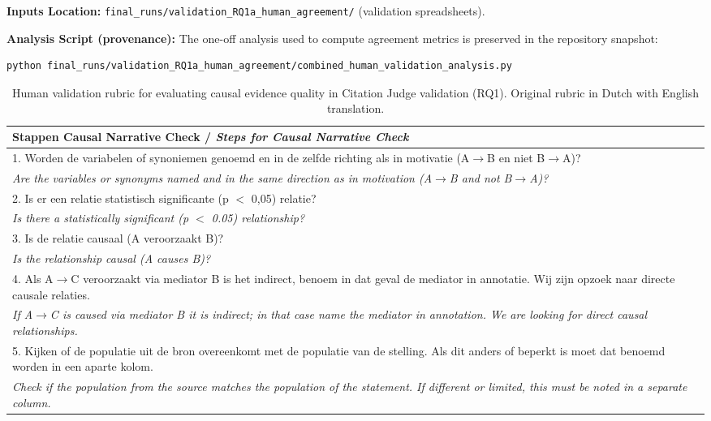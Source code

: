 \textbf{Inputs Location:} \texttt{final\_runs/validation\_RQ1a\_human\_agreement/} (validation spreadsheets).

\textbf{Analysis Script (provenance):} The one-off analysis used to compute agreement metrics is preserved in the repository snapshot:
{\small
\begin{verbatim}
python final_runs/validation_RQ1a_human_agreement/combined_human_validation_analysis.py
\end{verbatim}
}

\begin{table}[H]
\centering
\caption[Human validation rubric for RQ1]{Human validation rubric for evaluating causal evidence quality in Citation Judge validation (RQ1). Original rubric in Dutch with English translation.}
\label{tab:human-validation-rubric-rq1}
\small

\begin{tabular}{p{}}
\toprule
\textbf{Stappen Causal Narrative Check} / \textit{Steps for Causal Narrative Check} \\
\midrule
1. Worden de variabelen of synoniemen genoemd en in de zelfde richting als in motivatie (A$\to$B en niet B$\to$A)? \\
\textit{Are the variables or synonyms named and in the same direction as in motivation (A$\to$B and not B$\to$A)?} \\[0.5em]

2. Is er een relatie statistisch significante (p $<$ 0,05) relatie? \\
\textit{Is there a statistically significant (p $<$ 0.05) relationship?} \\[0.5em]

3. Is de relatie causaal (A veroorzaakt B)? \\
\textit{Is the relationship causal (A causes B)?} \\[0.5em]

4. Als A$\to$C veroorzaakt via mediator B is het indirect, benoem in dat geval de mediator in annotatie. Wij zijn opzoek naar directe causale relaties. \\
\textit{If A$\to$C is caused via mediator B it is indirect; in that case name the mediator in annotation. We are looking for direct causal relationships.} \\[0.5em]

5. Kijken of de populatie uit de bron overeenkomt met de populatie van de stelling. Als dit anders of beperkt is moet dat benoemd worden in een aparte kolom. \\
\textit{Check if the population from the source matches the population of the statement. If different or limited, this must be noted in a separate column.} \\[0.5em]


\end{tabular}
\end{table}
